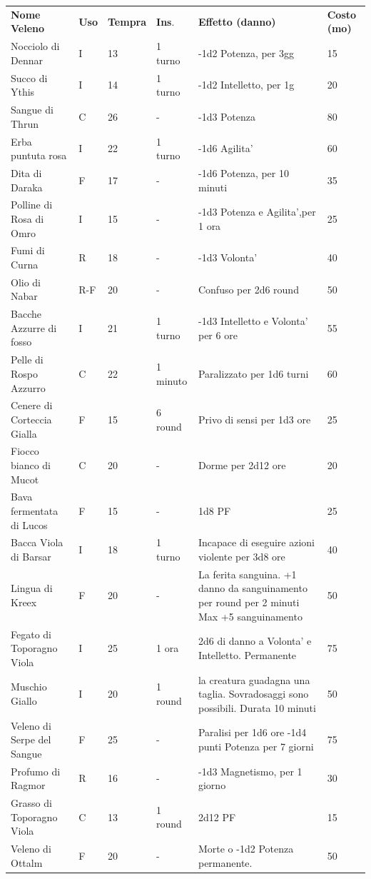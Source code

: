 \documentclass[a4paper,11pt,twoside,openany]{book}
\begin{document}
{\begin{tabular}{L{3.7cm} k{1cm} k{1.5cm} k{1.3cm} k{5.5cm} k{1.5cm}}
\toprule
\textbf{Nome Veleno} & \textbf{Uso} & \textbf{Tempra} & \textbf{Ins}. & \textbf{Effetto (danno)} & \textbf{Costo (mo)}\tabularnewline
Nocciolo di Dennar  & I & 13 & 1 turno & -1d2 Potenza, per 3gg & 15\tabularnewline
Succo di Ythis & I & 14 & 1 turno & -1d2 Intelletto, per 1g & 20\tabularnewline
Sangue di Thrun  & C & 26 & - & -1d3 Potenza & 80\tabularnewline
Erba puntuta rosa  & I & 22 & 1 turno & -1d6 Agilita' & 60\tabularnewline
Dita di Daraka & F & 17 & - & -1d6 Potenza, per 10 minuti & 35\tabularnewline
Polline di Rosa di Omro & I & 15 & - & -1d3 Potenza e Agilita',per 1 ora & 25\tabularnewline
Fumi di Curna& R & 18 & - & -1d3 Volonta' & 40\tabularnewline
Olio di Nabar  & R-F & 20 & - & Confuso per 2d6 round & 50\tabularnewline
Bacche Azzurre di fosso  & I & 21 & 1 turno & -1d3 Intelletto e Volonta' per 6 ore & 55\tabularnewline
Pelle di Rospo Azzurro  & C & 22 & 1 minuto & Paralizzato per 1d6 turni & 60\tabularnewline
Cenere di Corteccia Gialla  & F & 15 & 6 round & Privo di sensi per 1d3 ore & 25\tabularnewline
Fiocco bianco di Mucot & C & 20 & - & Dorme per 2d12 ore & 20\tabularnewline
Bava fermentata di Lucos  & F & 15 & - & 1d8 PF & 25\tabularnewline
Bacca Viola di Barsar & I & 18 & 1 turno & Incapace di eseguire azioni violente per 3d8 ore & 40\\
Lingua di Kreex  & F & 20 & - & La ferita sanguina. +1 danno da sanguinamento per round per 2 minuti Max +5 sanguinamento & 50 \\
Fegato di Toporagno Viola & I & 25 & 1 ora & 2d6 di danno a Volonta' e Intelletto. Permanente & 75\\
Muschio Giallo  & I & 20 & 1 round & la creatura guadagna una taglia. Sovradosaggi sono possibili. Durata 10 minuti & 50\tabularnewline
Veleno di Serpe del Sangue  & F & 25 & - & Paralisi per 1d6 ore -1d4 punti Potenza per 7 giorni & 75\\
Profumo di Ragmor & R & 16 & - & -1d3 Magnetismo, per 1 giorno & 30\tabularnewline
Grasso di Toporagno Viola  & C & 13 & 1 round & 2d12 PF & 15\tabularnewline
Veleno di Ottalm & F & 20 & - & Morte o -1d2 Potenza permanente. & 50\tabularnewline
\end{tabular}



}
\end{document}
